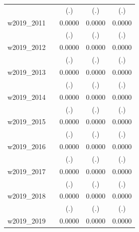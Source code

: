 \begin{table}[htbp]
\begin{tabular}{l*{4}{c}}
            &                     &         (.)         &         (.)         &         (.)         \\
[1em]
w2019\_2011  &                     &      0.0000         &      0.0000         &      0.0000         \\
            &                     &         (.)         &         (.)         &         (.)         \\
[1em]
w2019\_2012  &                     &      0.0000         &      0.0000         &      0.0000         \\
            &                     &         (.)         &         (.)         &         (.)         \\
[1em]
w2019\_2013  &                     &      0.0000         &      0.0000         &      0.0000         \\
            &                     &         (.)         &         (.)         &         (.)         \\
[1em]
w2019\_2014  &                     &      0.0000         &      0.0000         &      0.0000         \\
            &                     &         (.)         &         (.)         &         (.)         \\
[1em]
w2019\_2015  &                     &      0.0000         &      0.0000         &      0.0000         \\
            &                     &         (.)         &         (.)         &         (.)         \\
[1em]
w2019\_2016  &                     &      0.0000         &      0.0000         &      0.0000         \\
            &                     &         (.)         &         (.)         &         (.)         \\
[1em]
w2019\_2017  &                     &      0.0000         &      0.0000         &      0.0000         \\
            &                     &         (.)         &         (.)         &         (.)         \\
[1em]
w2019\_2018  &                     &      0.0000         &      0.0000         &      0.0000         \\
            &                     &         (.)         &         (.)         &         (.)         \\
[1em]
w2019\_2019  &                     &      0.0000         &      0.0000         &      0.0000         \\

\end{tabular}
\end{table}

